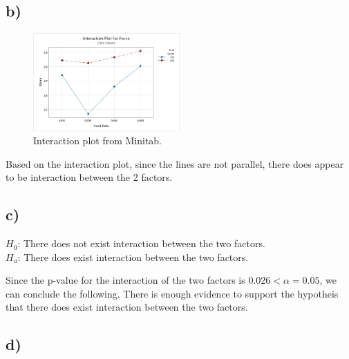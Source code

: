 \documentclass{article}
\begin{document}
\subsection*{b)}

\begin{figure}[h]
    \centering
    \includegraphics[width=0.5\textwidth]{./images/4_b.png}
    \caption{Interaction plot from Minitab.}
    \label{fig:3_b_2}
\end{figure}

Based on the interaction plot, since the lines are not parallel, there does appear to be interaction between the 2 factors.

\subsection*{c)}
\begin{flushleft}
    $H_0$: There does not exist interaction between the two factors. \\
    $H_a$: There does exist interaction between the two factors.\\
\end{flushleft}

Since the p-value for the interaction of the two factors is $0.026 < \alpha = 0.05$, we can conclude the following.
There is enough evidence to support the hypotheis that there does exist interaction between the two factors. 
\subsection*{d)}
\end{document}
